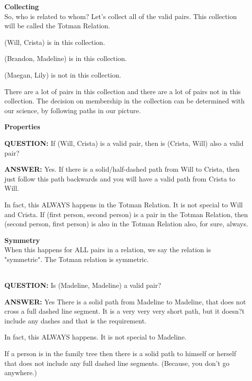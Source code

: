 \documentclass{ximera}
\begin{document}
\textbf{Collecting} \\
So, who is related to whom? Let's collect all of the valid pairs.  This collection will be called the Totman Relation.

(Will, Crista) is in this collection.

(Brandon, Madeline) is in this collection.

(Maegan, Lily) is not in this collection.

There are a lot of pairs in this collection and there are a lot of pairs not in this collection. The decision on membership in the collection can be determined with our science, by following paths in our picture. 








\textbf{Properties}




\textbf{QUESTION: }If (Will, Crista) is a valid pair, then is (Crista, Will) also a valid pair?

\textbf{ANSWER:} Yes. If there is a solid/half-dashed path from Will to Crista, then just follow this path backwards and you will have a valid path from Crista to Will.

In fact, this ALWAYS happens in the Totman Relation.  It is not special to Will and Crista.
If (first person, second person) is a pair in the Totman Relation, then (second person, first person) is also in the Totman Relation also, for sure, always. 


\begin{definition} 
\textbf{Symmetry} \\
When this happens for ALL pairs in a relation, we say the relation is "symmetric".  The Totman relation is symmetric.
\end{definition}
\quad \\


\textbf{QUESTION:} Is (Madeline, Madeline) a valid pair?

\textbf{ANSWER:} Yes There is a solid path from Madeline to Madeline, that does not cross a full dashed line segment.  It is a very very very short path, but it doesn?t include any dashes and that is the requirement.

In fact, this ALWAYS happens.  It is not special to Madeline. 

If a person is in the family tree then there is a solid path to himself or herself that does not include any full dashed line segments. (Because, you don't go anywhere.)
\end{document}
